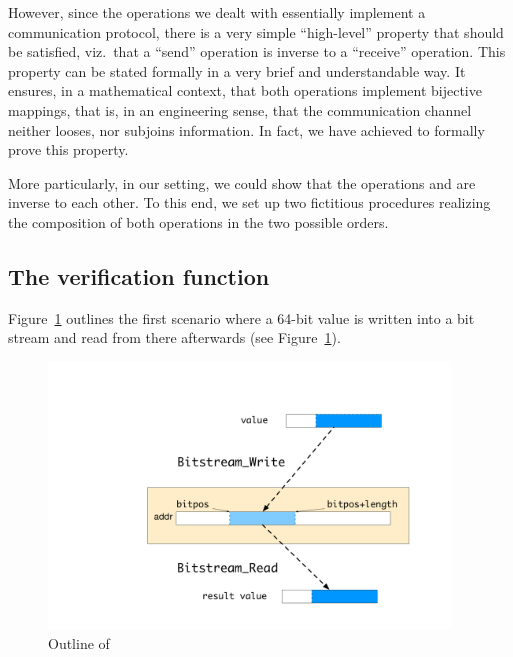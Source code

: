 However, since the operations we dealt with essentially implement a
communication protocol, there is a very simple ``high-level'' property
that should be satisfied, viz.\ that a ``send'' operation is inverse
to a ``receive'' operation.
%
This property can be stated formally in a very brief and understandable
way.
%
It ensures, in a mathematical context, that both operations implement
bijective mappings, that is, in an engineering sense, that the
communication channel neither looses, nor subjoins information.
%
In fact, we have achieved to formally prove this property.




More particularly, in our setting, we could show that the operations
 and  are
inverse to each other.
%
To this end, we set up two fictitious \isoc procedures realizing
the composition of both operations in the two possible orders.

\subsection{The verification function }

Figure~\ref{fig:bitstream-writethenread} outlines the first scenario
where a 64-bit value is written into a bit stream and read from there
afterwards (see Figure~\ref{fig:bitstream-writethenread}).

\begin{figure}[hbt]
\begin{center}
\includegraphics[width=0.95\textwidth]{figures/bitstream-writethenread.pdf}
\caption{\label{fig:bitstream-writethenread}
        Outline of }
\end{center}
\end{figure}

